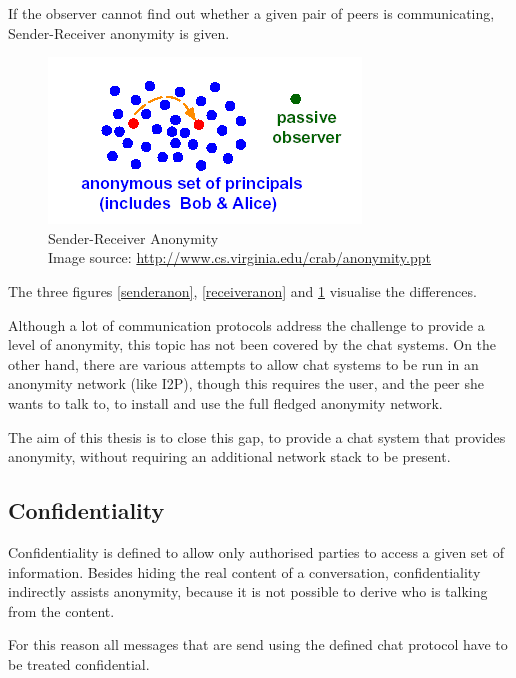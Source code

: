 If the observer cannot find out whether a given pair of peers
is communicating, Sender-Receiver anonymity is given.
\begin{figure}
    \centering
    \caption[Sender-Receiver Anonymity]{Sender-Receiver Anonymity\\Image source: \protect\url{http://www.cs.virginia.edu/crab/anonymity.ppt}}
    \label{senderreceiveranon}
    \includegraphics[scale=0.8]{sender-receiver-anon.png}
\end{figure}
The three figures \ref{senderanon}, \ref{receiveranon} and
\ref{senderreceiveranon} visualise the differences.

Although a lot of communication protocols address the challenge
to provide a level of anonymity, this topic has not been covered
by the chat systems. On the other hand, there are various attempts
to allow chat systems to be run in an anonymity network (like I2P), 
though this requires the user, and the peer she wants to talk to,
to install and use the full fledged anonymity network.

The aim of this thesis is to close this gap, to provide a chat system
that provides anonymity, without requiring an additional network stack
to be present.
\subsection{Confidentiality}
Confidentiality is defined to allow only authorised parties to access
a given set of information. Besides hiding the real content of a conversation,
confidentiality indirectly assists anonymity, because it is not possible to
derive who is talking from the content.

For this reason all messages that are send using the defined chat protocol
have to be treated confidential.
% 
